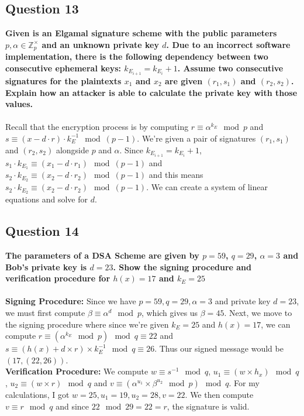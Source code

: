 \documentclass[titlepage]{article}
\begin{document}
{\subsection{Question 13}
{
\textbf{Given is an Elgamal signature scheme with the public parameters \(p, \alpha \in \mathbb{Z}_p^{\times}\) and an unknown private key \(d\). Due to an incorrect software implementation, there is the following dependency between two consecutive ephemeral keys: \(k_{E_{i + 1}} = k_{E_i} + 1\). Assume two consecutive signatures for the plaintexts \(x_1\) and \(x_2\) are given \((r_1, s_1)\) and \((r_2, s_2)\). Explain how an attacker is able to calculate the private key with those values.}\\\\
Recall that the encryption process is by computing \(r \equiv \alpha^{k_E} \mod p\) and \(s \equiv (x - d \cdot r) \cdot k_E^{-1} \mod (p - 1)\). We're given a pair of signatures \((r_1, s_1)\) and \((r_2, s_2)\) alongside \(p\) and \(\alpha\). Since \(k_{E_{i + 1}} = k_{E_i} + 1\), \(s_1 \cdot k_{E_1} \equiv (x_1 - d \cdot r_1) \mod (p - 1)\) and \(s_2 \cdot k_{E_2} \equiv (x_2 - d \cdot r_2) \mod (p - 1)\) and this means \(s_2 \cdot k_{E_2} \equiv (x_2 - d \cdot r_2) \mod (p - 1)\). We can create a system of linear equations and solve for \(d\). 
}
\clearpage
\subsection{Question 14}
{
\textbf{The parameters of a DSA Scheme are given by \(p = 59\), \(q = 29\), \(\alpha = 3\) and Bob's private key is \(d = 23\). Show the signing procedure and verification procedure for \(h(x) = 17\) and \(k_E = 25\)}\\\\
\textbf{Signing Procedure:} Since we have \(p = 59, q = 29, \alpha = 3\) and private key \(d = 23\), we must first compute \(\beta \equiv \alpha^d \mod p\), which gives us \(\beta = 45\). Next, we move to the signing procedure where since we're given \(k_E = 25\) and \(h(x) = 17\), we can compute \(r \equiv (\alpha^{k_E} \mod p) \mod q \equiv 22\) and \(s \equiv (h(x) + d \times r) \times k_E^{-1} \mod q \equiv 26\). Thus our signed message would be \((17, (22, 26))\).\\
\textbf{Verification Procedure:} We compute \(w \equiv s^{-1} \mod q\), \(u_1 \equiv (w \times h_x) \mod q\), \(u_2 \equiv (w \times r) \mod q\) and \(v \equiv (\alpha^{u_1} \times \beta^{u_2} \mod p) \mod q\). For my calculations, I got \(w = 25, u_1 = 19, u_2 = 28, v = 22\). We then compute \(v \equiv r \mod q\) and since \(22 \mod 29 = 22 = r\), the signature is valid. 
}
}
\end{document}
